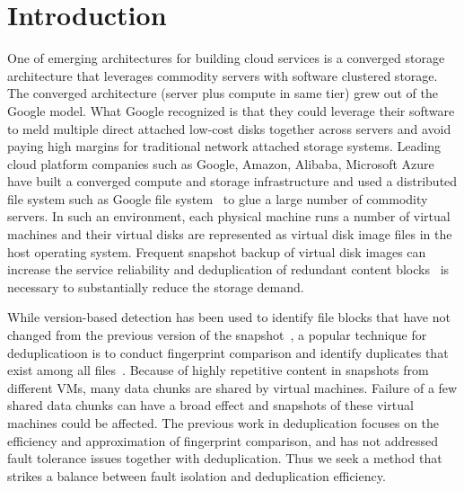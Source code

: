\section{Introduction}

One of emerging architectures for building cloud services
is a converged storage architecture that leverages commodity servers with software clustered storage.
The converged architecture (server plus compute in same tier) grew out of the Google model. What Google recognized is that they could leverage their software to meld multiple direct attached low-cost disks together across servers and avoid paying high margins for traditional network attached storage systems. %
Leading cloud platform companies such as Google, Amazon, Alibaba,
Microsoft Azure  have built a converged compute and storage infrastructure and used
a distributed file system such as Google file system~\cite{googlefs03,hdfs10}
to glue a large number of commodity servers.
In such an environment,
each physical machine runs a number  of virtual machines 
and their  virtual disks are represented as virtual disk image files in the host operating system.
Frequent  snapshot backup of virtual disk images  can increase  the service reliability
and deduplication of redundant content blocks~\cite{venti02,bottleneck08}
 is necessary to substantially reduce the storage demand.
 

While version-based detection  has been used to  identify file  blocks that have not 
changed from the previous version of the snapshot~\cite{Clements2009,Vrable2009,TanIPDPS2011},
a popular technique for deduplicatioon is to 
conduct fingerprint  comparison and identify duplicates that exist
among all files~\cite{Guo2011,Dong2011,extreme_binning09}. 
Because of highly repetitive content in snapshots from different VMs,
many data chunks are shared by virtual machines.  
Failure of a few shared data chunks can have a 
broad effect and snapshots of these virtual machines could be affected.
The previous work in deduplication focuses on the efficiency and approximation of
fingerprint comparison, and has not addressed fault tolerance issues  together with deduplication.
Thus we seek a method that strikes a balance between fault isolation and deduplication efficiency.


